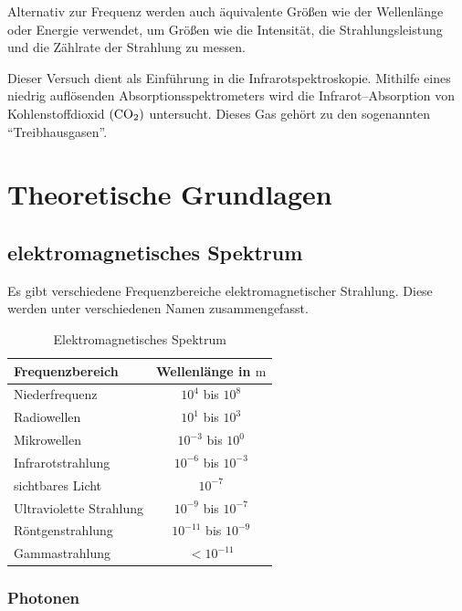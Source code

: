\documentclass[12pt,a4paper]{scrartcl}
\numberwithin{equation}{section} %
\renewcommand{\[}{} %
\renewcommand{\]}{\noindent} %
\begin{document}
Alternativ zur Frequenz werden auch äquivalente Größen wie der
Wellenlänge oder Energie verwendet, um Größen wie die Intensität, die
Strahlungsleistung und die Zählrate der Strahlung zu messen.

Dieser Versuch dient als Einführung in die Infrarotspektroskopie.
Mithilfe eines niedrig auflösenden Absorptionsspektrometers wird die
Infrarot--Absorption von Kohlenstoffdioxid \((\ce{CO_2})\) untersucht.
Dieses Gas gehört zu den sogenannten ``Treibhausgasen''.

\clearpage
\hypertarget{theoretische-grundlagen}{%
\section{Theoretische Grundlagen}\label{theoretische-grundlagen}}

\hypertarget{elektromagnetisches-spektrum}{%
\subsection{elektromagnetisches
Spektrum}\label{elektromagnetisches-spektrum}}

Es gibt verschiedene Frequenzbereiche elektromagnetischer Strahlung.
Diese werden unter verschiedenen Namen zusammengefasst.

\begin{table}[h]
	\centering
	\begin{tabular}{l|c}
		Frequenzbereich & Wellenlänge in \(\mathrm m\) \\
		\hline
		Niederfrequenz & \(10^4\) bis \(10^8\) \\
		Radiowellen & \(10^1\) bis \(10^3\) \\
		Mikrowellen & \(10^{-3}\) bis \(10^{0}\) \\
		Infrarotstrahlung & \(10^{-6}\) bis \(10^{-3}\) \\
		sichtbares Licht & \(10^{-7}\) \\
		Ultraviolette Strahlung & \(10^{-9}\) bis \(10^{-7}\) \\
		Röntgenstrahlung & \(10^{-11}\) bis \(10^{-9}\) \\
		Gammastrahlung & \(<10^{-11}\)
	\end{tabular}
	\caption{Elektromagnetisches Spektrum}
	\label{tab:emSpektrum}
\end{table}

\hypertarget{photonen}{%
\subsubsection{Photonen}\label{photonen}}
\end{document}
